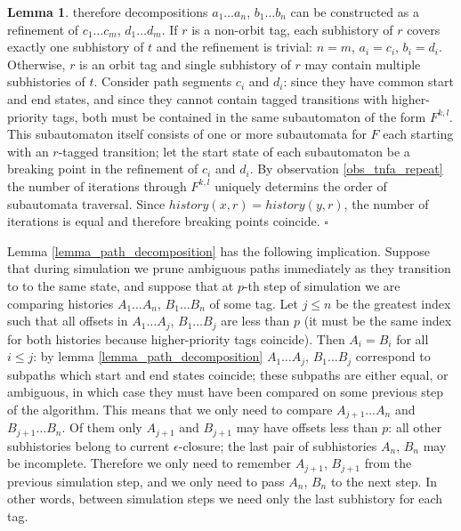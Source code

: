 \documentclass{article}
\newcommand{\Xeq}{\!=\!}
\theoremstyle{definition}
\newtheorem{XLem}{Lemma}
\begin{document}
\begin{multicols}{2}
\begin{XLem}
therefore decompositions $a_1 \dots a_n$, $b_1 \dots b_n$ can be constructed as a refinement of $c_1 \dots c_m$, $d_1 \dots d_m$.
If $r$ is a non-orbit tag, each subhistory of $r$ covers exactly one subhistory of $t$
and the refinement is trivial: $n \Xeq m$, $a_i \Xeq c_i$, $b_i \Xeq d_i$.
Otherwise, $r$ is an orbit tag and single subhistory of $r$ may contain multiple subhistories of $t$.
Consider path segments $c_i$ and $d_i$:
since they have common start and end states, and since they cannot contain tagged transitions with higher-priority tags,
both must be contained in the same subautomaton of the form $F^{k,l}$.
This subautomaton itself consists of one or more subautomata for $F$ each starting with an $r$-tagged transition;
let the start state of each subautomaton be a breaking point in the refinement of $c_i$ and $d_i$.
By observation \ref{obs_tnfa_repeat} the number of iterations through $F^{k,l}$ uniquely determins the order of subautomata traversal.
Since $history(x, r) \Xeq history(y, r)$, the number of iterations is equal and
therefore breaking points coincide.
$\square$
\end{XLem}

Lemma \ref{lemma_path_decomposition} has the following implication.
Suppose that during simulation we prune ambiguous paths immediately as they transition to to the same state,
and suppose that
at $p$-th step of simulation we are comparing histories $A_1 \dots A_n$, $B_1 \dots B_n$ of some tag.
Let $j \!\leq\! n$ be the greatest index such that all offsets in $A_1 \dots A_j$, $B_1 \dots B_j$ are less than $p$
(it must be the same index for both histories because higher-priority tags coincide).
Then $A_i \Xeq B_i$ for all $i \!\leq\! j$:
by lemma \ref{lemma_path_decomposition} $A_1 \dots A_j$, $B_1 \dots B_j$
correspond to subpaths which start and end states coincide;
these subpaths are either equal, or ambiguous, in which case they must have been compared on some previous step of the algorithm.
This means that we only need to compare $A_{j+1} \dots A_n$ and $B_{j+1} \dots B_n$.
Of them only $A_{j+1}$ and $B_{j+1}$ may have offsets less than $p$:
all other subhistories belong to current $\epsilon$-closure;
the last pair of subhistories $A_n$, $B_n$ may be incomplete.
Therefore we only need to remember $A_{j+1}$, $B_{j+1}$ from the previous simulation step,
and we only need to pass $A_n$, $B_n$ to the next step.
In other words, between simulation steps we need only the last subhistory for each tag.
\\


\end{multicols}
\end{document}
